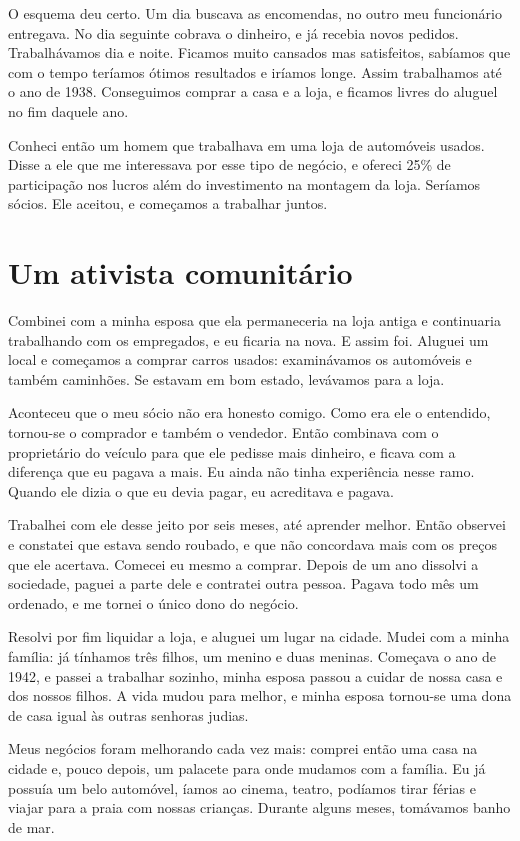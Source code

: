 O esquema deu certo. Um dia buscava as encomendas, no outro meu
funcionário entregava. No dia seguinte cobrava o dinheiro, e já
recebia novos pedidos. Trabalhávamos dia e noite. Ficamos muito
cansados mas satisfeitos, sabíamos que com o tempo teríamos ótimos
resultados e iríamos longe. Assim trabalhamos até o ano de 1938. Conseguimos 
comprar a casa e a loja, e ficamos livres do aluguel no fim
daquele ano. 

Conheci então um homem que trabalhava em uma
loja de automóveis usados. Disse a ele que me interessava por
esse tipo de negócio, e ofereci 25\% de participação nos lucros além do
investimento na montagem da loja. Seríamos sócios. Ele aceitou, e
começamos a trabalhar juntos.

\chapter{Um ativista comunitário}

Combinei com a minha esposa que ela permaneceria na loja antiga e
continuaria trabalhando com os empregados, e eu ficaria na nova. E assim
foi. Aluguei um local e começamos a comprar carros usados: examinávamos
os automóveis e também caminhões. Se estavam em bom estado, levávamos
para a loja.

Aconteceu que o meu sócio não era honesto comigo. Como era ele o
entendido, tornou-se o comprador e também o vendedor. Então 
combinava com o proprietário do veículo para que ele pedisse mais
dinheiro, e ficava com a diferença que eu pagava a mais. Eu ainda não
tinha experiência nesse ramo. Quando ele dizia o que eu devia
pagar, eu acreditava e pagava. 

Trabalhei com ele desse jeito por seis meses,
até aprender melhor. Então observei e constatei que estava sendo roubado, 
e que não concordava mais com os preços que ele acertava. Comecei eu 
mesmo a comprar. Depois de um ano dissolvi a
sociedade, paguei a parte dele e contratei outra pessoa. Pagava todo mês
um ordenado, e me tornei o único dono do negócio.

Resolvi por fim liquidar a loja, e aluguei um lugar na cidade. Mudei com a
minha família: já tínhamos três filhos, um menino e duas meninas. Começava o ano de 1942, e passei a trabalhar sozinho, minha esposa passou a 
cuidar de nossa casa e dos nossos filhos. A vida mudou para
melhor, e minha esposa tornou-se uma dona de casa igual às outras senhoras
judias.

Meus negócios foram melhorando cada vez mais: comprei então uma casa na
cidade e, pouco depois, um palacete para onde mudamos com a família. Eu já
possuía um belo automóvel, íamos ao cinema, teatro, podíamos tirar
férias e viajar para a praia com nossas crianças. Durante alguns
meses, tomávamos banho de mar.

